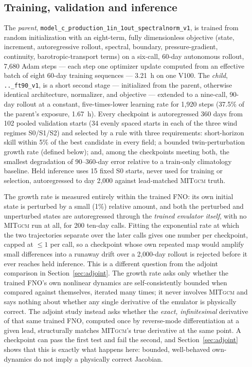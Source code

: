 \documentclass[3p,12pt]{elsarticle}
\newcommand{\MITgcm}{\textsc{MITgcm}}
\newcommand{\FNO}{FNO}
\begin{document}
\subsection{Training, validation and inference}

The \emph{parent}, \texttt{model\_c\_production\_1in\_1out\_spectralnorm\_v1},
is trained from random initialization with an eight-term, fully dimensionless
objective (state, increment, autoregressive rollout, spectral, boundary,
pressure-gradient, continuity, barotropic-transport terms) on a six-call,
60-day autonomous rollout, 7{,}680 Adam steps --- each step one optimizer
update computed from an effective batch of eight 60-day training sequences ---
3.21~h on one V100. The \emph{child}, \texttt{..\_ft90\_v1}, is a short second
stage --- initialized from the parent, otherwise identical architecture,
normalizer, and objective --- extended to a nine-call, 90-day rollout at a
constant, five-times-lower learning rate for 1{,}920 steps (37.5\% of the
parent's exposure, 1.67~h). Every checkpoint is autoregressed 360 days from
102 pooled validation starts (34 evenly spaced starts in each of the three
wind regimes S0/S1/S2) and selected by a rule with three requirements:
short-horizon skill within 5\% of the best candidate in every field; a bounded
twin-perturbation growth rate (defined below); and, among the checkpoints
meeting both, the smallest degradation of 90--360-day error relative to a
train-only climatology baseline. Held inference uses 15 fixed S0 starts,
never used for training or selection, autoregressed to day 2{,}000 against
lead-matched \MITgcm{} truth.

The growth rate is measured entirely within the trained \FNO{}: its own
initial state is perturbed by a small (1\%) relative amount, and both the
perturbed and unperturbed states are autoregressed through the \emph{trained
emulator itself}, with no \MITgcm{} run at all, for 200 ten-day calls. Fitting
the exponential rate at which the two trajectories separate over the later
calls gives one number per checkpoint, capped at $\le1$ per call, so a
checkpoint whose own repeated map would amplify small differences into a
runaway drift over a 2{,}000-day rollout is rejected before it ever reaches
held inference. This is a different question from the adjoint comparison in
Section~\ref{sec:adjoint}. The growth rate asks only whether the trained
\FNO{}'s own nonlinear dynamics are self-consistently bounded when compared
against themselves, iterated many times; it never involves \MITgcm{} and says
nothing about whether any single derivative of the emulator is physically
correct. The adjoint study instead asks whether the \emph{exact, infinitesimal}
derivative of that same trained \FNO{}, computed once by reverse-mode
differentiation at a given lead, structurally matches \MITgcm{}'s true
derivative at the same point. A checkpoint can pass the first test and fail
the second, and Section~\ref{sec:adjoint} shows that this is exactly what
happens here: bounded, well-behaved own-dynamics do not imply a physically
correct Jacobian.
\end{document}
